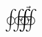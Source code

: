 \documentclass{standalone}
\begin{document}
$\displaystyle
 \oint\kern.15em\vec\varoiintctrclockwise\kern-2.60em\varoiintclockwise~~
$
\end{document}
